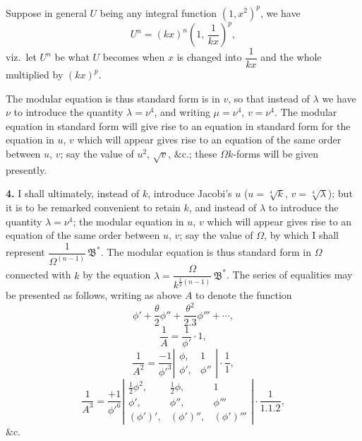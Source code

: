 \documentclass[11pt]{article}
\begin{document}
Suppose in general $U$ being any integral function $(1, x^{2})^{p}$, we have
\[
U^{n} = (kx)^{n}\!\left(1,\,\frac{1}{kx}\right)^{p},
\]
viz.\ let $U^{n}$ be what $U$ becomes when $x$ is changed into $\dfrac{1}{kx}$ and the whole multiplied by $(kx)^{p}$.

The modular equation is thus standard form is in $v$, so that instead of $\lambda$ we have $\nu$ to introduce the quantity $\lambda = \nu^{4}$, and writing $\mu = \nu^{4}$, $v = \nu^{4}$. The modular equation in standard form will give rise to an equation in standard form for the equation in $u$, $v$ which will appear gives rise to an equation of the same order between $u$, $v$; say the value of $u^{2}$, $\sqrt{v}$, $\&\mathrm{c.}$; these $\Omega k$-forms will be given presently.

\textbf{4.} I shall ultimately, instead of $k$, introduce Jacobi's $u$ ($u = \sqrt[4]{k}$, $v = \sqrt[4]{\lambda}$); but it is to be remarked convenient to retain $k$, and instead of $\lambda$ to introduce the quantity $\lambda = \nu^{4}$; the modular equation in $u$, $v$ which will appear gives rise to an equation of the same order between $u$, $v$; say the value of $\Omega$, by which I shall represent $\dfrac{1}{\Omega^{(n-1)}}\,\mathfrak{B}^{*}$. The modular equation is thus standard form in $\Omega$ connected with $k$ by the equation $\lambda = \dfrac{\Omega}{k^{\frac{1}{2}(n-1)}}\,\mathfrak{B}^{*}$. The series of equalities may be presented as follows, writing as above $A$ to denote the function
\[
\phi' + \frac{\theta}{2}\phi'' + \frac{\theta^{2}}{2.3}\phi''' + \cdots,
\]
\[
\frac{1}{A} = \frac{1}{\phi'}\cdot 1,
\]
\[
\frac{1}{A^{2}} = \frac{-1}{\phi'^{3}}\!\left|\begin{array}{cc}\phi,&1\\ \phi',&\phi''\end{array}\right|\cdot\frac{1}{1},
\]
\[
\frac{1}{A^{3}} = \frac{+1}{\phi'^{6}}\!\left|\begin{array}{ccc}\tfrac{1}{2}\phi^{2},&\tfrac{1}{2}\phi,&1\\ \phi',&\phi'',&\phi'''\\ (\phi')',&(\phi')'',&(\phi')'''\end{array}\right|\cdot\frac{1}{1.1.2},
\]
\&c.
\end{document}
